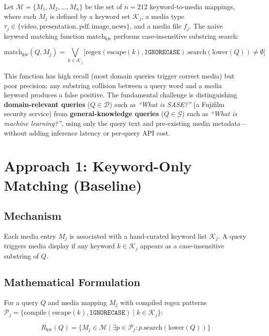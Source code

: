 \documentclass{article}
\begin{document}
Let $\mathcal{M} = \{M_1, M_2, \ldots, M_n\}$ be the set of $n = 212$ keyword-to-media mappings, where each $M_j$ is defined by a keyword set $\mathcal{K}_j$, a media type $\tau_j \in \{\text{video}, \text{presentation}, \text{pdf}, \text{image}, \text{news}\}$, and a media file $f_j$. The naive keyword matching function $\text{match}_{\text{kw}}$ performs case-insensitive substring search:

\begin{equation}
\text{match}_{\text{kw}}(Q, M_j) = \bigvee_{k \in \mathcal{K}_j} \big[ \text{regex}(\text{escape}(k), \texttt{IGNORECASE}).\text{search}(\text{lower}(Q)) \neq \emptyset \big]
\end{equation}

This function has high recall (most domain queries trigger correct media) but poor precision: any substring collision between a query word and a media keyword produces a false positive. The fundamental challenge is distinguishing \textbf{domain-relevant queries} ($Q \in \mathcal{D}$) such as \textit{``What is SASE?''} (a Fujifilm security service) from \textbf{general-knowledge queries} ($Q \in \mathcal{G}$) such as \textit{``What is machine learning?''}, using only the query text and pre-existing media metadata—without adding inference latency or per-query API cost.

\section{Approach 1: Keyword-Only Matching (Baseline)}

\subsection{Mechanism}
Each media entry $M_j$ is associated with a hand-curated keyword list $\mathcal{K}_j$. A query triggers media display if any keyword $k \in \mathcal{K}_j$ appears as a case-insensitive substring of $Q$.

\subsection{Mathematical Formulation}
For a query $Q$ and media mapping $M_j$ with compiled regex patterns $\mathcal{P}_j = \{\text{compile}(\text{escape}(k), \texttt{IGNORECASE}) \mid k \in \mathcal{K}_j\}$:

\begin{equation}
R_{\text{kw}}(Q) = \{ M_j \in \mathcal{M} \mid \exists p \in \mathcal{P}_j : p.\text{search}(\text{lower}(Q)) \}
\end{equation}
\end{document}
